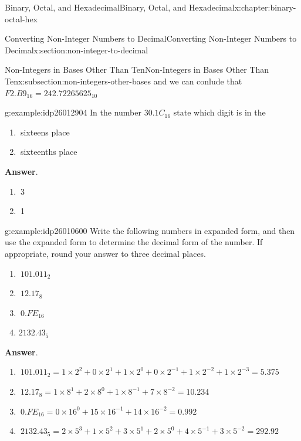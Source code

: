 \documentclass[twoside,10pt,]{book}
\newcommand{\blocktitlefont}{\relax}
\numberwithin{equation}{section}
\begin{document}
\begin{chapterptx}{Binary, Octal, and Hexadecimal}{}{Binary, Octal, and Hexadecimal}{}{}{x:chapter:binary-octal-hex}
\begin{sectionptx}{Converting Non-Integer Numbers to Decimal}{}{Converting Non-Integer Numbers to Decimal}{}{}{x:section:non-integer-to-decimal}
\begin{subsectionptx}{Non-Integers in Bases Other Than Ten}{}{Non-Integers in Bases Other Than Ten}{}{}{x:subsection:non-integers-other-bases}
and we can conlude that \(F2.B9_{16}=242.72265625_{10}\)%
\begin{example}{}{g:example:idp26012904}%
In the number \(30.1C_{16}\) state which digit is in the %
\begin{enumerate}
\item{}\(\ \)sixteens place%
\item{}\(\ \)sixteenths place%
\end{enumerate}
\par\smallskip%
\noindent\textbf{\blocktitlefont Answer}.\label{g:answer:idp26014056}{}\hypertarget{g:answer:idp26014056}{}\quad{}%
\begin{enumerate}
\item{}\(\ \)3%
\item{}\(\ \)1%
\end{enumerate}
\end{example}
\begin{example}{}{g:example:idp26010600}%
Write the following numbers in expanded form, and then use the expanded form to determine the decimal form of the number.  If appropriate, round your answer to three decimal places. %
\begin{enumerate}
\item{}\(\displaystyle \ 101.011_2\)%
\item{}\(\displaystyle \ 12.17_8\)%
\item{}\(\displaystyle \ 0.FE_{16}\)%
\item{}\(\displaystyle 2132.43_5\)%
\end{enumerate}
\par\smallskip%
\noindent\textbf{\blocktitlefont Answer}.\label{g:answer:idp26009704}{}\hypertarget{g:answer:idp26009704}{}\quad{}%
\begin{enumerate}
\item{}\(\displaystyle \ 101.011_2=1\times2^2+0\times2^1+1\times2^0+0\times2^{-1}+1\times2^{-2}+1\times2^{-3}=5.375\)%
\item{}\(\displaystyle \ 12.17_8=1\times8^1+2\times8^0+1\times8^{-1}+7\times8^{-2}=10.234\)%
\item{}\(\displaystyle \ 0.FE_{16}=0\times16^0+15\times16^{-1}+14\times16^{-2}=0.992\)%
\item{}\(\displaystyle \ 2132.43_5=2\times5^3+1\times5^2+3\times5^1+2\times5^0+4\times5^{-1}+3\times5^{-2}=292.92\)%
\end{enumerate}
\end{example}
\end{subsectionptx}
%
%
\typeout{************************************************}

\end{sectionptx}
\end{chapterptx}
\end{document}
